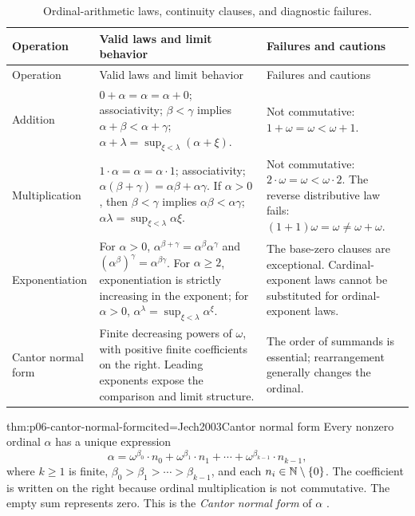 \begingroup\small
\begin{longtable}{@{}p{}p{}p{}@{}}
\caption{Ordinal-arithmetic laws, continuity clauses, and diagnostic
failures.}\label{tab:p06-ordinal-arithmetic}\\
\toprule
Operation & Valid laws and limit behavior & Failures and cautions \\
\midrule
\endfirsthead
\toprule
Operation & Valid laws and limit behavior & Failures and cautions \\
\midrule
\endhead
Addition &
\(0+\alpha=\alpha=\alpha+0\); associativity;
\(\beta<\gamma\) implies \(\alpha+\beta<\alpha+\gamma\);
\(\alpha+\lambda=\sup_{\xi<\lambda}(\alpha+\xi)\). &
Not commutative: \(1+\omega=\omega<\omega+1\). \\
\addlinespace
Multiplication &
\(1\cdot\alpha=\alpha=\alpha\cdot1\); associativity;
\(\alpha(\beta+\gamma)=\alpha\beta+\alpha\gamma\).
If \(\alpha>0\), then
\(\beta<\gamma\) implies \(\alpha\beta<\alpha\gamma\);
\(\alpha\lambda=\sup_{\xi<\lambda}\alpha\xi\). &
Not commutative: \(2\cdot\omega=\omega<\omega\cdot2\).
The reverse distributive law fails:
\((1+1)\omega=\omega\ne\omega+\omega\). \\
\addlinespace
Exponentiation &
For \(\alpha>0\),
\(\alpha^{\beta+\gamma}=\alpha^\beta\alpha^\gamma\) and
\((\alpha^\beta)^\gamma=\alpha^{\beta\gamma}\).
For \(\alpha\geq2\), exponentiation is strictly increasing in the exponent;
for \(\alpha>0\),
\(\alpha^\lambda=\sup_{\xi<\lambda}\alpha^\xi\). &
The base-zero clauses are exceptional.  Cardinal-exponent laws cannot be
substituted for ordinal-exponent laws. \\
\addlinespace
Cantor normal form &
Finite decreasing powers of \(\omega\), with positive finite coefficients on
the right.  Leading exponents expose the comparison and limit structure. &
The order of summands is essential; rearrangement generally changes the
ordinal. \\
\bottomrule
\end{longtable}
\endgroup

\begin{hbtheorem}{thm:p06-cantor-normal-form}{cited=Jech2003}{Cantor normal form}
Every nonzero ordinal \(\alpha\) has a unique expression
\[
 \alpha=
 \omega^{\beta_0}\cdot n_0+
 \omega^{\beta_1}\cdot n_1+\cdots+
 \omega^{\beta_{k-1}}\cdot n_{k-1},
\]
where \(k\geq1\) is finite,
\(\beta_0>\beta_1>\cdots>\beta_{k-1}\), and each
\(n_i\in\mathbb{N}\setminus\{0\}\).  The coefficient is written on the right because
ordinal multiplication is not commutative.  The empty sum represents zero.
This is the \emph{Cantor normal form} of \(\alpha\)
\cite{Cantor1897,Sierpinski1965}.
\end{hbtheorem}

